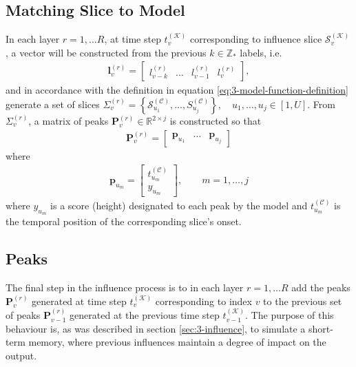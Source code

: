 \subsection{Matching Slice to Model}\label{sec:3-influence-model}
In each layer $r = 1,\dots R$, at time step $t^{(\mathcal K)}_v$ corresponding to influence slice $\mathcal S_v^{(\mathcal K)}$, a vector will be constructed from the previous  $k \in \mathbb Z_\ast$ labels, i.e.
\begin{align}
	\bm l_v^{(r)} = \begin{bmatrix} l_{v-k}^{(r)} & \dots & l_{v-1}^{(r)} & l_v^{(r)} \end{bmatrix},
\end{align}
and in accordance with the definition in equation \ref{eq:3-model-function-definition} generate a set of slices $\Sigma_v^{(r)} = \left\lbrace \mathcal S^{(\mathcal C)}_{u_1}, \dots, S^{(\mathcal C)}_{u_j}\right\rbrace, \quad u_1,\dots,u_j \in [1,U]$. From $\Sigma_v^{(r)}$, a matrix of peaks $\bm P_v^{(r)} \in \mathbb R^{2\times j}$ is constructed so that
\begin{align}
	\bm P_v^{(r)} = \begin{bmatrix} \bm p_{u_1} & \dots & \bm p_{u_j} \end{bmatrix}
\end{align}
where 
\begin{align}
	\bm p_{u_m} = \begin{bmatrix} t_{u_m}^{(\mathcal C)}  \\[0.17cm] y_{u_m} \end{bmatrix}, \qquad m = 1,\dots,j
\end{align}
where $y_{u_m}$ is a score (height) designated to each peak by the model and $t_{u_m}^{(\mathcal C)}$ is the temporal position of the corresponding slice's onset.


\subsection{Peaks}\label{sec:3-influence-peaks}
The final step in the influence process is to in each layer $r = 1,\dots R$ add the peaks $\bm P_v^{(r)}$ generated at time step $t^{(\mathcal K)}_v$ corresponding to index $v$ to the previous set of peaks $\bm P_{v-1}^{(r)}$ generated at the previous time step $t^{(\mathcal K)}_{v-1}$. The purpose of this behaviour is, as was described in section \ref{sec:3-influence}, to simulate a short-term memory, where previous influences maintain a degree of impact on the output. 

